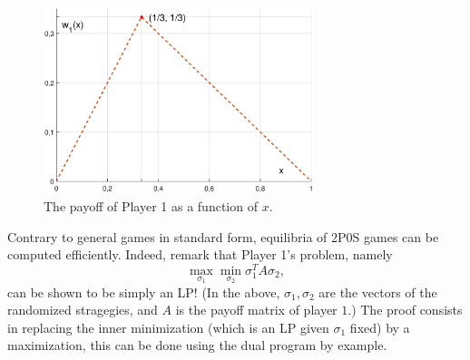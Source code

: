 \begin{example}
\begin{figure}[!ht]
\centering
\includegraphics[width = 0.7\textwidth]{figP2OS.eps}
\caption{The payoff of Player 1 as a function of $x$.}
\label{chap3:figP2OS}
\end{figure}


\end{example}
Contrary to general games in standard form, equilibria of 2P0S games can be computed efficiently.  Indeed, remark that Player 1's problem, namely $$ \max_{\sigma_1}{\min_{\sigma_2}{ \sigma_1^T A \sigma_2}} ,$$ can be shown to be simply an LP!  (In the above, $\sigma_1,\sigma_2$ are the vectors of the randomized stragegies, and $A$ is the payoff matrix of player $1$.) The proof consists in replacing the inner minimization (which is an LP given $\sigma_1$ fixed) by a maximization, this can be done using the dual program by example.


\ifx \globalmark \undefined %


	
\else

\fi
